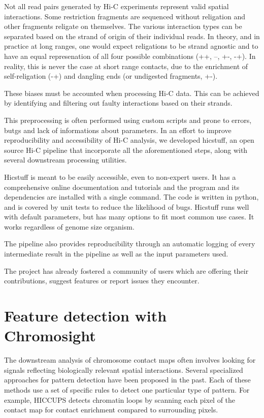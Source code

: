 Not all read pairs generated by Hi-C experiments represent valid spatial interactions. Some restriction fragments are sequenced without religation and other fragments religate on themselves. The various interaction types can be separated based on the strand of origin of their individual reads. In theory, and in practice at long ranges, one would expect religations to be strand agnostic and to have an equal represenation of all four possible combinations (++, --, +-, -+). In reality, this is never the case at short range contacts, due to the enrichment of self-religation (-+) and dangling ends (or undigested fragments, +-).

These biases must be accounted when processing Hi-C data. This can be achieved by identifying and filtering out faulty interactions based on their strands.

This preprocessing is often performed using custom scripts and prone to errors, butgs and lack of informations about parameters. In an effort to improve reproducibility and accessibility of Hi-C analysis, we developed hicstuff, an open source Hi-C pipeline that incorporate all the aforementioned steps, along with several downstream processing utilities.

Hicstuff is meant to be easily accessible, even to non-expert users. It has a comprehensive online documentation and tutorials and the program and its dependencies are installed with a single command. The code is written in python, and is covered by unit tests to reduce the likelihood of bugs. Hicstuff runs well with default parameters, but has many options to fit most common use cases. It works regardless of genome size organism.

The pipeline also provides reproducibility through an automatic logging of every intermediate result in the pipeline as well as the input parameters used.

The project has already fostered a community of users which are offering their contributions, suggest features or report issues they encounter.

\section{Feature detection with Chromosight}

The downstream analysis of chromosome contact maps often involves looking for signals reflecting biologically relevant spatial interactions. Several specialized approaches for pattern detection have been proposed in the past. Each of these methods use a set of specific rules to detect one particular type of pattern. For example, HICCUPS detects chromatin loops by scanning each pixel of the contact map for contact enrichment compared to surrounding pixels.

